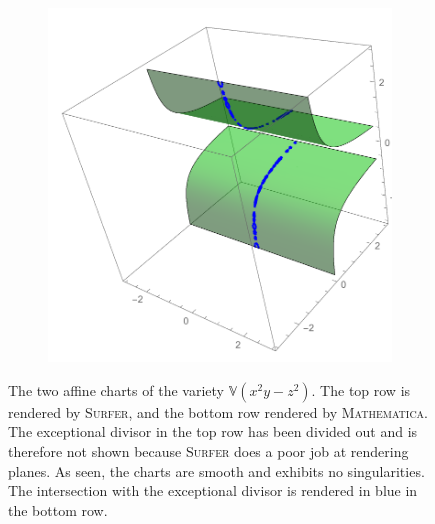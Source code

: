 \documentclass{article}
\newcommand{\V}{\ensuremath{\mathbb{V}}}
\begin{document}
\begin{example}
\begin{figure}[h!]
\begin{subfigure}[t]{0.3\textwidth}
            \end{subfigure}
            ~
            \begin{subfigure}[t]{0.3\textwidth}
                \includegraphics[width=\textwidth]{pictures/affine_2_exceptional.pdf} 
            \end{subfigure}
            \caption{The two affine charts of the variety $\V(x^2y-z^2)$. The top
                row is rendered by \textsc{Surfer}, and the bottom row rendered by
                \textsc{Mathematica.} The exceptional divisor in the top row has
                been divided out and is therefore not shown because \textsc{Surfer}
                does a poor job at rendering planes. As seen, the charts are smooth and
                exhibits no singularities. The intersection with the exceptional divisor is
            rendered in blue in the bottom row.}
        \end{figure}
    \end{example}
\end{document}
